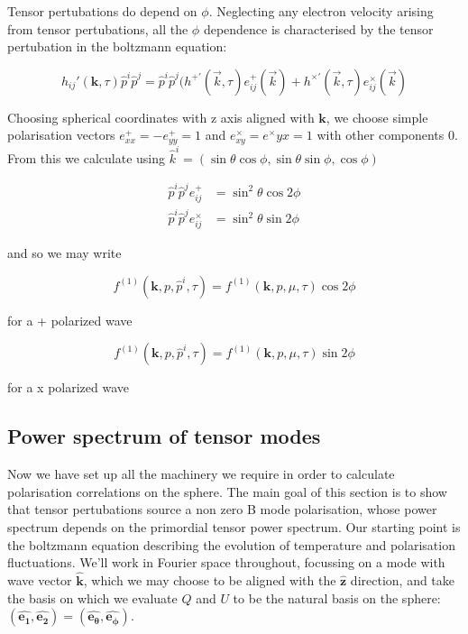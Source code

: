 \documentclass[a4paper,11pt]{article}
\renewcommand{\v}[1]{\mathbf{#1}}
\newcommand{\unit}[1]{\hat{\v{#1}}}
\begin{document}
Tensor pertubations do depend on $\phi$. Neglecting any electron velocity arising from tensor pertubations, all the $\phi$ dependence is characterised by the tensor pertubation in the boltzmann equation:

\begin{equation}
h_{ij}'(\v{k},\tau)\hat{p}^i\hat{p}^j = \hat{p}^i\hat{p}^j (h^{+'}(\vec{k},\tau)e_{ij}^+(\vec{k}) + h^{\times'}(\vec{k},\tau)e_{ij}^\times(\vec{k})
\end{equation}

Choosing spherical coordinates with z axis aligned with $\v{k}$, we choose simple polarisation vectors $e^+_{xx}=-e^+_{yy}=1$ and $e^\times_{xy}=e^\times{yx}=1$ with other components 0. From this we calculate using $\hat{k}^i = (\sin\theta\cos\phi, \sin\theta\sin\phi, \cos\phi)$

\begin{align}
\hat{p}^i\hat{p}^je_{ij}^+ &= \sin^2{\theta}\cos{2\phi} \\
\hat{p}^i\hat{p}^je_{ij}^\times &= \sin^2{\theta}\sin{2\phi}
\end{align}

and so we may write 

\begin{equation}
f^{(1)}(\v{k}, p, \hat{p}^i, \tau) = f^{(1)}(\v{k}, p, \mu, \tau)\cos{2\phi}
\end{equation}

for a + polarized wave


\begin{equation}
f^{(1)}(\v{k}, p, \hat{p}^i, \tau) = f^{(1)}(\v{k}, p, \mu, \tau)\sin{2\phi}
\end{equation}

for a x polarized wave


\subsection{Power spectrum of tensor modes}

Now we have set up all the machinery we require in order to calculate polarisation correlations on the sphere. The main goal of this section is to show that tensor pertubations source a non zero B mode polarisation, whose power spectrum depends on the primordial tensor power spectrum. Our starting point is the boltzmann equation describing the evolution of temperature and polarisation fluctuations.  We'll work in Fourier space throughout, focussing on a mode with wave vector $\unit{k}$, which we may choose to be aligned with the $\unit{z}$ direction, and take the basis on which we evaluate $Q$ and $U$ to be the natural basis on the sphere: $(\unit{e_1}, \unit{e_2}) = (\unit{e_\theta}, \unit{e_\phi})$.
\end{document}

